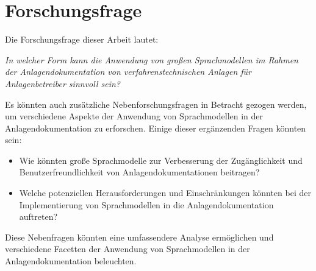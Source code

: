 \section{Forschungsfrage}
\label{sec:research_question}

Die Forschungsfrage dieser Arbeit lautet:

\vspace{0.3cm}
\begin{center}
    \textit{In welcher Form kann die Anwendung von großen Sprachmodellen im Rahmen der Anlagendokumentation von verfahrenstechnischen Anlagen für Anlagenbetreiber sinnvoll sein?}
\end{center}

Es könnten auch zusätzliche Nebenforschungsfragen in Betracht gezogen werden, um verschiedene Aspekte der Anwendung von Sprachmodellen in der Anlagendokumentation zu erforschen. Einige dieser ergänzenden Fragen könnten sein:

\begin{itemize}
    \item Wie könnten große Sprachmodelle zur Verbesserung der Zugänglichkeit und Benutzerfreundlichkeit von Anlagendokumentationen beitragen?
    \item Welche potenziellen Herausforderungen und Einschränkungen könnten bei der Implementierung von Sprachmodellen in die Anlagendokumentation auftreten?
\end{itemize}

Diese Nebenfragen könnten eine umfassendere Analyse ermöglichen und verschiedene Facetten der Anwendung von Sprachmodellen in der Anlagendokumentation beleuchten.
